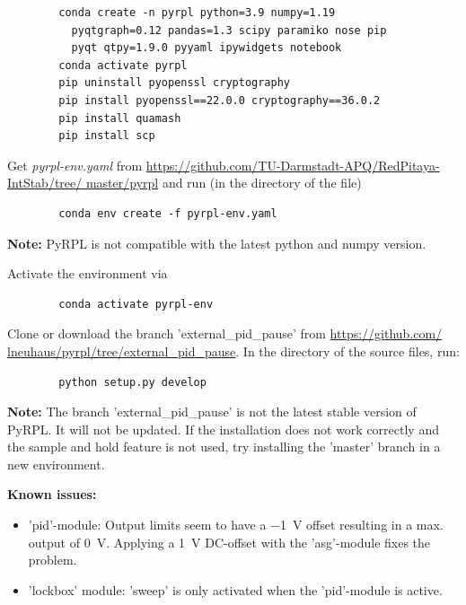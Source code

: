 \documentclass[twoside,a4paper]{refart}
\begin{document}
\begin{tcolorbox}
	\begin{verbatim}
		conda create -n pyrpl python=3.9 numpy=1.19
		  pyqtgraph=0.12 pandas=1.3 scipy paramiko nose pip 
		  pyqt qtpy=1.9.0 pyyaml ipywidgets notebook
		conda activate pyrpl
		pip uninstall pyopenssl cryptography
		pip install pyopenssl==22.0.0 cryptography==36.0.2
		pip install quamash
		pip install scp
	\end{verbatim}
\end{tcolorbox}


Get \textit{pyrpl-env.yaml} from \href{https://github.com/TU-Darmstadt-APQ/RedPitaya-IntStab/tree/master/pyrpl}{https://github.com/TU-Darmstadt-APQ/RedPitaya-IntStab/tree/ master/pyrpl} and run (in the directory of the file)

\begin{tcolorbox}
	\begin{verbatim}
		conda env create -f pyrpl-env.yaml
	\end{verbatim}
\end{tcolorbox}

\textbf{Note:}  PyRPL is not compatible with the latest python and numpy version.

Activate the environment via

\begin{tcolorbox}
	\begin{verbatim}
		conda activate pyrpl-env
	\end{verbatim}
\end{tcolorbox}

Clone or download the branch 'external\_pid\_pause' from \href{https://github.com/lneuhaus/pyrpl/tree/external_pid_pause}{https://github.com/ lneuhaus/pyrpl/tree/external\_pid\_pause}. In the directory of the source files, run:

\begin{tcolorbox}
	\begin{verbatim}
		python setup.py develop
	\end{verbatim}
\end{tcolorbox}

\textbf{Note:} The branch 'external\_pid\_pause' is not the latest stable version of PyRPL. It will not be updated. If the installation does not work correctly and the sample and hold feature is not used, try installing the 'master' branch in a new environment.

\textbf{Known issues:}
\begin{itemize}
	\item 'pid'-module: Output limits seem to have a \SI{-1}{\volt} offset resulting in a max. output of \SI{0}{\volt}. Applying a \SI{1}{\volt} DC-offset with the 'asg'-module fixes the problem.
	\item 'lockbox' module: 'sweep' is only activated when the 'pid'-module is active.
\end{itemize}   
\end{document}
